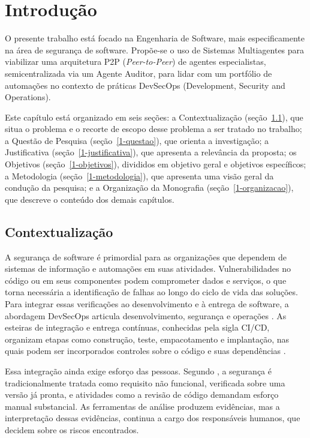 \chapter{Introdução}
\label{1-introducao}

O presente trabalho está focado na Engenharia de Software, mais especificamente na área de segurança de software. Propõe-se o uso de Sistemas Multiagentes para viabilizar uma arquitetura P2P (\textit{Peer-to-Peer}) de agentes especialistas, semicentralizada via um Agente Auditor, para lidar com um portfólio de automações no contexto de práticas DevSecOps (Development, Security and Operations).

Este capítulo está organizado em seis seções: a Contextualização (seção~\ref{1-contextualizacao}), que situa o problema e o recorte de escopo desse problema a ser tratado no trabalho; a Questão de Pesquisa (seção~\ref{1-questao}), que orienta a investigação; a Justificativa (seção~\ref{1-justificativa}), que apresenta a relevância da proposta; os Objetivos (seção~\ref{1-objetivos}), divididos em objetivo geral e objetivos específicos; a Metodologia (seção~\ref{1-metodologia}), que apresenta uma visão geral da condução da pesquisa; e a Organização da Monografia (seção~\ref{1-organizacao}), que descreve o conteúdo dos demais capítulos.

\section{Contextualização}
\label{1-contextualizacao}

A segurança de software é primordial para as organizações que dependem de sistemas de informação e automações em suas atividades. Vulnerabilidades no código ou em seus componentes podem comprometer dados e serviços, o que torna necessária a identificação de falhas ao longo do ciclo de vida das soluções. Para integrar essas verificações ao desenvolvimento e à entrega de software, a abordagem DevSecOps articula desenvolvimento, segurança e operações \cite{owaspDevSecOps}. As esteiras de integração e entrega contínuas, conhecidas pela sigla CI/CD, organizam etapas como construção, teste, empacotamento e implantação, nas quais podem ser incorporados controles sobre o código e suas dependências \cite{chandramouli2024}.

Essa integração ainda exige esforço das pessoas. Segundo , a segurança é tradicionalmente tratada como requisito não funcional, verificada sobre uma versão já pronta, e atividades como a revisão de código demandam esforço manual substancial. As ferramentas de análise produzem evidências, mas a interpretação dessas evidências, continua a cargo dos responsáveis humanos, que decidem sobre os riscos encontrados.

